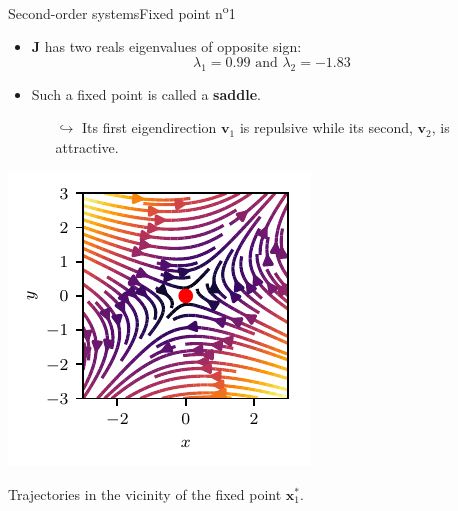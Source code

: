 \documentclass[usenames,dvipsnames,svgnames,10pt,aspectratio=169]{beamer}
\begin{document}
\begin{frame}[t, c]{Second-order systems}{Fixed point n\textsuperscript{o}1}
		\begin{minipage}{.48\textwidth}
			\begin{itemize}
				\item ${\bm J}$ has two reals eigenvalues of opposite sign:
				$$\lambda_1 = 0.99 \text{ and } \lambda_2 = -1.83$$

				\item Such a fixed point is called a \alert{\textbf{saddle}}.
				\begin{itemize}
					\item[$\hookrightarrow$] Its first eigendirection ${\bm v}_1$ is repulsive while its second, ${\bm v}_2$, is attractive.
				\end{itemize}
			\end{itemize}
		\end{minipage}%
		\hfill
		\begin{minipage}{.48\textwidth}
			\centering
			\includegraphics[width=.75\textwidth]{fixed_points_1_bis}

			{\small Trajectories in the vicinity of the fixed point ${\bm x}^*_1$.}
		\end{minipage}

		\vspace{1cm}
\end{frame}
\end{document}
